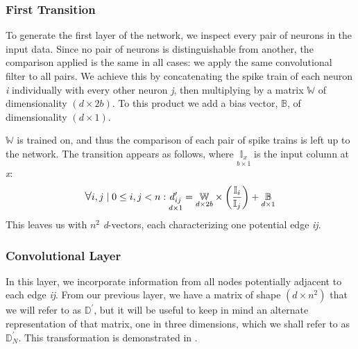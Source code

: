 \subsubsection{First Transition}
To generate the first layer of the network, we inspect every pair of neurons in 
the input data. Since no pair of neurons is distinguishable from another, the 
comparison applied is the same in all cases: we apply the same convolutional 
filter to all pairs. We achieve this by concatenating the spike train of each 
neuron \textit{i} individually with every other neuron \textit{j}, then 
multiplying by a matrix $\mathbb{W}$ of dimensionality $(d \times 2b)$. To this 
product we add a bias vector, $\mathbb{B}$, of dimensionality $(d \times 1)$.

$\mathbb{W}$ is trained on, and thus the comparison of each pair of spike trains 
is left up to the network. The transition appears as follows, where $\underset{b 
\times 1}{\mathbb{I}_x}$ is the input column at \textit{x}:
\[
	\mathlarger\forall i,j \mid 0 \leq i,j < n: \underset{d \times 
	1}{d_{ij}^\prime} = \underset{d \times 2b}{\mathbb{W}} \times 
	\left(\frac{\mathbb{I}_i}{\mathbb{I}_j}\right) + \underset{d \times 
	1}{\mathbb{B}}
\]
This leaves us with $n^2$ \textit{d}-vectors, each characterizing one potential 
edge \textit{ij}.

\subsubsection{Convolutional Layer}
In this layer, we incorporate information from all nodes potentially adjacent to 
each edge \textit{ij}. From our previous layer, we have a matrix of shape $(d 
\times n^2)$ that we will refer to as $\mathbb{D}^{\prime}$, but it will be 
useful to keep in mind an alternate representation of that matrix, one in three 
dimensions, which we shall refer to as $\mathbb{D}_N^{\prime}$. This 
transformation is demonstrated in .

